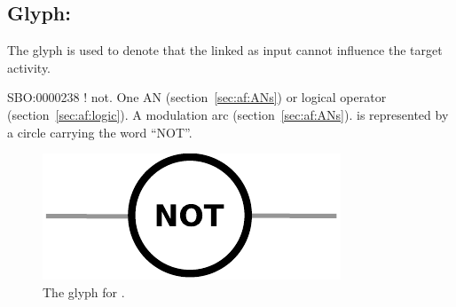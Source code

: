 \subsection{Glyph: }
\label{sec:af:not}

The glyph  is used to denote that the  linked as input cannot influence the target activity.

\begin{glyphDescription}
 \glyphSboTerm SBO:0000238 ! not.
 \glyphOrigin One AN (section~\ref{sec:af:ANs}) or logical operator (section~\ref{sec:af:logic}).
 \glyphTarget A modulation arc (section~\ref{sec:af:ANs}).
 \glyphNode {} is represented by a circle carrying the word ``NOT''.
 \end{glyphDescription}

\begin{figure}[H]
  \centering
  \includegraphics[scale = 0.5]{images/not}
  \caption{The \AF glyph for .}
  \label{fig:af:not}
\end{figure}
